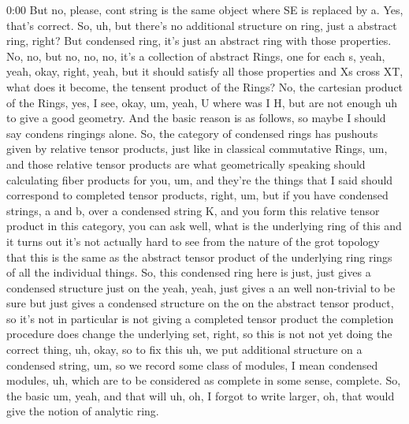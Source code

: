 \begin{unfinished}{0:00}
But no, please, cont string is the same object where SE is replaced by a. Yes, that's correct. So, uh, but there's no additional structure on ring, just a abstract ring, right? But condensed ring, it's just an abstract ring with those properties. No, no, but no, no, no, it's a collection of abstract Rings, one for each s, yeah, yeah, okay, right, yeah, but it should satisfy all those properties and Xs cross XT, what does it become, the tensent product of the Rings? No, the cartesian product of the Rings, yes, I see, okay, um, yeah, U where was I H, but are not enough uh to give a good geometry. And the basic reason is as follows, so maybe I should say condens ringings alone. So, the category of condensed rings has pushouts given by relative tensor products, just like in classical commutative Rings, um, and those relative tensor products are what geometrically speaking should calculating fiber products for you, um, and they're the things that I said should correspond to completed tensor products, right, um, but if you have condensed strings, a and b, over a condensed string K, and you form this relative tensor product in this category, you can ask well, what is the underlying ring of this and it turns out it's not actually hard to see from the nature of the grot topology that this is the same as the abstract tensor product of the underlying ring rings of all the individual things. So, this condensed ring here is just, just gives a condensed structure just on the yeah, yeah, just gives a an well non-trivial to be sure but just gives a condensed structure on the on the abstract tensor product, so it's not in particular is not giving a completed tensor product the completion procedure does change the underlying set, right, so this is not not yet doing the correct thing, uh, okay, so to fix this uh, we put additional structure on a condensed string, um, so we record some class of modules, I mean condensed modules, uh, which are to be considered as complete in some sense, complete. So, the basic um, yeah, and that will uh, oh, I forgot to write larger, oh, that would give the notion of analytic ring.


\end{unfinished}
